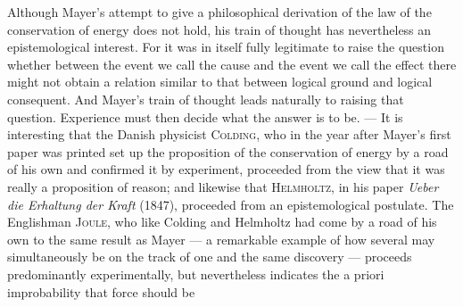 \documentclass[12pt,a4paper]{book}
\newcommand{\opage}[1]{\marginnote{\footnotesize\textit{[#1]}}}
\begin{document}
Although Mayer's attempt to give a philosophical derivation of the law of the
conservation of energy does not hold, his train of thought has nevertheless an
epistemological interest. For it was in itself fully legitimate to raise the
question whether between the event we call the cause and the event we call the
effect there might not obtain a relation similar to that between logical ground
and logical consequent. And Mayer's train of thought leads naturally to raising
that question. Experience must then decide what the answer is to be. --- It is
interesting that the Danish physicist \textsc{Colding}, who in the year after
Mayer's first paper was printed set up the proposition of the conservation of
energy by a road of his own and confirmed it by experiment, proceeded from the
view that it was really a proposition of reason; and likewise that
\textsc{Helmholtz}, in his paper \textit{Ueber die Erhaltung der Kraft} (1847),
proceeded from an epistemological postulate. The Englishman \textsc{Joule}, who
like Colding and Helmholtz had come by a road of his own to the same result as
Mayer --- a remarkable example of how several may simultaneously be on the track
of one and the same discovery --- proceeds \opage{499}predominantly experimentally, but
nevertheless indicates the a priori improbability that force should be
\end{document}
